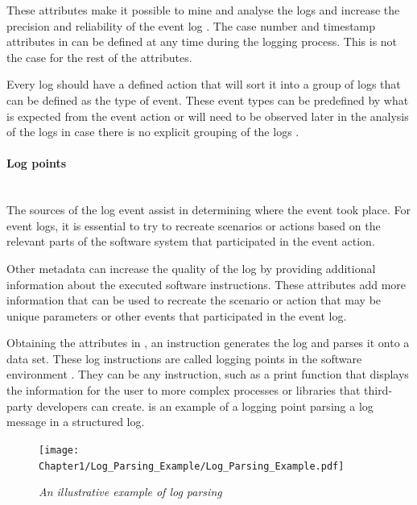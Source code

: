These attributes make it possible to mine and analyse the logs and increase the precision and reliability of the event log \cite{Kherbouche2017}. The case number and timestamp attributes in  can be defined at any time during the logging process. This is not the case for the rest of the attributes. \par Every log should have a defined action that will sort it into a group of logs that can be defined as the type of event. These event types can be predefined by what is expected from the event action or will need to be observed later in the analysis of the logs in case there is no explicit grouping of the logs \cite{Bekeneva2020, Fedaghi2010}.

\paragraph{Log points}\leavevmode\\
The sources of the log event assist in determining where the event took place. For event logs, it is essential to try to recreate scenarios or actions based on the relevant parts of the software system that participated in the event action.\par Other metadata can increase the quality of the log by providing additional information about the executed software instructions. These attributes add more information that can be used to recreate the scenario or action that may be unique parameters or other events that participated in the event log.\par Obtaining the attributes in , an instruction generates the log and parses it onto a data set. These log instructions are called logging points in the software environment \cite{Pecchia2015, Zhu2015}. They can be any instruction, such as a print function that displays the information for the user to more complex processes or libraries that third-party developers can create.  is an example of a logging point parsing a log message in a structured log. 

\clearpage

\begin{figure}[!htb]
	\centering %
	\texttt{[image: Chapter1/Log\_Parsing\_Example/Log\_Parsing\_Example.pdf]}
	\caption[An illustrative example of log parsing]
	{\textit{An illustrative example of log parsing \cite{Zhu2019}}} \label{fig:ch1_logParsing}
\end{figure}


